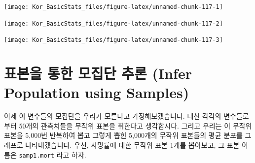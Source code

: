 \documentclass[]{book}
\newenvironment{Shaded}{\begin{snugshade}}{\end{snugshade}}
\newcommand{\CommentTok}[1]{\textcolor[rgb]{0.56,0.35,0.01}{\textit{#1}}}
\newcommand{\DataTypeTok}[1]{\textcolor[rgb]{0.13,0.29,0.53}{#1}}
\newcommand{\KeywordTok}[1]{\textcolor[rgb]{0.13,0.29,0.53}{\textbf{#1}}}
\newcommand{\NormalTok}[1]{#1}
\newcommand{\OperatorTok}[1]{\textcolor[rgb]{0.81,0.36,0.00}{\textbf{#1}}}
\newcommand{\StringTok}[1]{\textcolor[rgb]{0.31,0.60,0.02}{#1}}
\begin{document}
\begin{center}\texttt{[image: Kor\_BasicStats\_files/figure-latex/unnamed-chunk-117-1]} \end{center}

\begin{Shaded}
\end{Shaded}

\begin{center}\texttt{[image: Kor\_BasicStats\_files/figure-latex/unnamed-chunk-117-2]} \end{center}

\begin{Shaded}
\end{Shaded}

\begin{center}\texttt{[image: Kor\_BasicStats\_files/figure-latex/unnamed-chunk-117-3]} \end{center}

\hypertarget{uxd45cuxbcf8uxc744-uxd1b5uxd55c-uxbaa8uxc9d1uxb2e8-uxcd94uxb860-infer-population-using-samples}{%
\section{표본을 통한 모집단 추론 (Infer Population using Samples)}\label{uxd45cuxbcf8uxc744-uxd1b5uxd55c-uxbaa8uxc9d1uxb2e8-uxcd94uxb860-infer-population-using-samples}}

이제 이 변수들의 모집단을 우리가 모른다고 가정해보겠습니다. 대신 각각의 변수들로부터 50개의 관측치들을 무작위 표본을 취한다고 생각합시다. 그리고 우리는 이 무작위 표본을 5,000번 반복하여 뽑고 그렇게 뽑힌 5,000개의 무작위 표본들의 평균 분포를 그래프로 나타내겠습니다. 우선, 사망률에 대한 무작위 표본 1개를 뽑아보고, 그 표본 이름은 \texttt{samp1.mort} 라고 하자.
\end{document}
